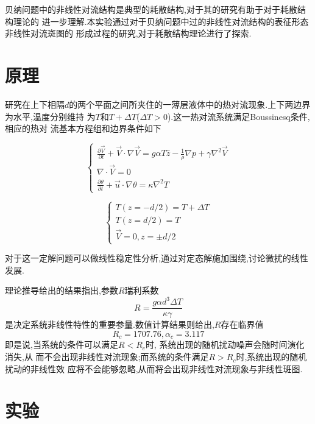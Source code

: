 \documentclass[aps,pre,12pt,preprint,onecolumn,showpacs,showkeys,floatfix]{revtex4-1}
\begin{document}
贝纳问题中的非线性对流结构是典型的耗散结构,对于其的研究有助于对于耗散结构理论的
进一步理解.本实验通过对于贝纳问题中过的非线性对流结构的表征形态非线性对流斑图的
形成过程的研究,对于耗散结构理论进行了探索.

\section{原理}

研究在上下相隔$d$的两个平面之间所夹住的一薄层液体中的热对流现象.上下两边界为水平,温度分别维持
为$T$和$T+\Delta T$($\Delta T > 0$).这一热对流系统满足Boussinesq条件,相应的热对
流基本方程组和边界条件如下

\begin{equation}
    \begin{cases}
        \frac{\partial \vec{V}}{\partial t} + \vec{V} \cdot \nabla\vec{V} =
        g\alpha T\hat{z} - \frac{1}{\rho}\nabla p + \gamma\nabla^2\vec{V} \\
        \nabla\cdot\vec{V} = 0 \\
        \frac{\partial \theta}{\partial t} + \vec{u}\cdot\nabla\theta =
        \kappa\nabla^2 T
    \end{cases}
\end{equation}

\begin{equation}
    \begin{cases}
        T(z = -d/2) = T + \Delta T \\
        T(z = d/2) = T \\
        \vec{V} = 0, z = \pm d/2
    \end{cases}
\end{equation}

对于这一定解问题可以做线性稳定性分析,通过对定态解施加围绕,讨论微扰的线性发展.

理论推导给出的结果指出,参数$R$瑞利系数
\begin{equation}
    R = \frac{g\alpha d^3\Delta T}{\kappa\gamma}
\end{equation}
是决定系统非线性特性的重要参量.数值计算结果则给出,$R$存在临界值
\begin{equation}
    R_c = 1707.76, \alpha_c = 3.117
\end{equation}
即是说,当系统的条件可以满足$R<R_c$时, 系统出现的随机扰动噪声会随时间演化消失,从
而不会出现非线性对流现象;而系统的条件满足$R>R_c$时,系统出现的随机扰动的非线性效
应将不会能够忽略,从而将会出现非线性对流现象与非线性斑图.

\section{实验}
\end{document}
